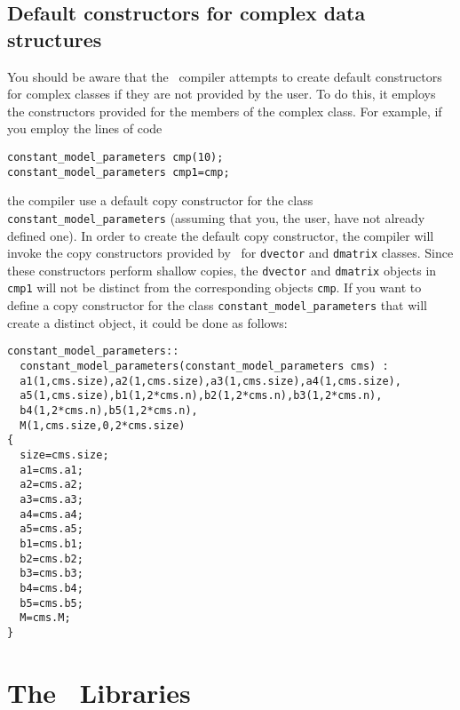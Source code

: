 \documentclass{admbmanual}
\begin{document}
\section{Default constructors for complex data structures}

You should be aware that the \cplus\ compiler attempts to create default
constructors for complex classes if they are not provided by the user. To do
this, it employs the constructors provided for the members of the complex class.
For example, if you employ the lines of code
\begin{lstlisting}
constant_model_parameters cmp(10);
constant_model_parameters cmp1=cmp;
\end{lstlisting}
the compiler use a default copy constructor for the class
\texttt{constant\_model\_parameters} (assuming that you, the user, have not
already defined one). In order to create the default copy constructor, the
compiler will invoke the copy constructors provided by \scAD\ for
\texttt{dvector} and \texttt{dmatrix} classes. Since these constructors perform
shallow copies, the \texttt{dvector} and \texttt{dmatrix} objects in
\texttt{cmp1} will not be distinct from the corresponding objects \texttt{cmp}.
If you want to define a copy constructor for the class
\texttt{constant\_model\_parameters} that will create a distinct object, it
could be done as follows:
\begin{lstlisting}
constant_model_parameters::
  constant_model_parameters(constant_model_parameters cms) :
  a1(1,cms.size),a2(1,cms.size),a3(1,cms.size),a4(1,cms.size),
  a5(1,cms.size),b1(1,2*cms.n),b2(1,2*cms.n),b3(1,2*cms.n),
  b4(1,2*cms.n),b5(1,2*cms.n),
  M(1,cms.size,0,2*cms.size)
{
  size=cms.size;
  a1=cms.a1;
  a2=cms.a2;
  a3=cms.a3;
  a4=cms.a4;
  a5=cms.a5;
  b1=cms.b1;
  b2=cms.b2;
  b3=cms.b3;
  b4=cms.b4;
  b5=cms.b5;
  M=cms.M;
}
\end{lstlisting}


\chapter{The \scAD\ Libraries}
\end{document}
